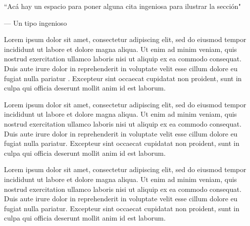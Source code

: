 \documentclass[12pt]{article} %
\begin{document}
\epigraph{``Acá hay un espacio para poner alguna cita ingeniosa para ilustrar la sección"}{--- \textup{Un tipo ingenioso}}



Lorem ipsum dolor sit amet, consectetur adipiscing elit, sed do eiusmod tempor incididunt ut labore et dolore magna aliqua. Ut enim ad minim veniam, quis nostrud exercitation ullamco laboris nisi ut aliquip ex ea commodo consequat. Duis aute irure dolor in reprehenderit \citep{ruiz_nicolini_juan_pablo_fuego_nodate} in voluptate velit esse cillum dolore eu fugiat nulla pariatur \citep{ruiz_nicolini_impacto_2017}. Excepteur sint occaecat cupidatat non proident, sunt in culpa qui officia deserunt mollit anim id est laborum.

Lorem ipsum dolor sit amet, consectetur adipiscing elit, sed do eiusmod tempor incididunt ut labore et dolore magna aliqua. Ut enim ad minim veniam, quis nostrud exercitation ullamco laboris nisi ut aliquip ex ea commodo consequat. Duis aute irure dolor in reprehenderit in voluptate velit esse cillum dolore eu fugiat nulla pariatur. Excepteur sint occaecat cupidatat non proident, sunt in culpa qui officia deserunt mollit anim id est laborum.

Lorem ipsum dolor sit amet, consectetur adipiscing elit, sed do eiusmod tempor incididunt ut labore et dolore magna aliqua. Ut enim ad minim veniam, quis nostrud exercitation ullamco laboris nisi ut aliquip ex ea commodo consequat. Duis aute irure dolor in reprehenderit in voluptate velit esse cillum dolore eu fugiat nulla pariatur. Excepteur sint occaecat cupidatat non proident, sunt in culpa qui officia deserunt mollit anim id est laborum.

\clearpage



 

\end{document}

